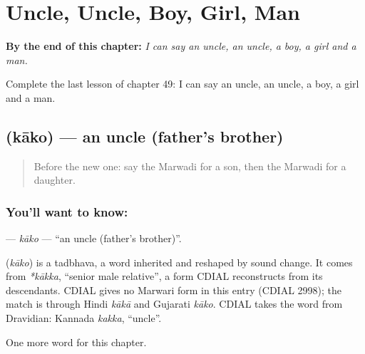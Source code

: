 
\chapter{Uncle, Uncle, Boy, Girl, Man}
\label{ch:mw-uncle-uncle-boy-girl-man}

\begin{chapteropening}
\textbf{By the end of this chapter:} \emph{I can say an uncle, an uncle, a boy, a girl and a man.}

Complete the last lesson of chapter 49: I can say an uncle, an uncle, a boy, a girl and a man.
\end{chapteropening}

\section[\texorpdfstring{\mw{काको} (kāko)}{काको (kāko)}]{ (kāko) — an uncle (father's brother)}

\label{lesson:MW-C49-kako}



\begin{quote}
Before the new one: say the Marwadi for a son, then the Marwadi for a daughter.
\end{quote}

\subsection*{You'll want to know: }
\textbf{} — \emph{kāko} — \textquotedblleft{}an uncle (father's brother)\textquotedblright{}.

\begin{cousinweb}
\textbf{} (\emph{kāko}) is a tadbhava, a word inherited and reshaped by sound change. It comes from \emph{*kākka}, \textquotedblleft{}senior male relative\textquotedblright{}, a form CDIAL reconstructs from its descendants. CDIAL gives no Marwari form in this entry (CDIAL 2998); the match is through Hindi \emph{kākā} and Gujarati \emph{kāko}. CDIAL takes the word from Dravidian: Kannada \emph{kakka}, \textquotedblleft{}uncle\textquotedblright{}.
\end{cousinweb}

\begin{grammarlens}[title={What you've built}]
One more word for this chapter.
\end{grammarlens}

